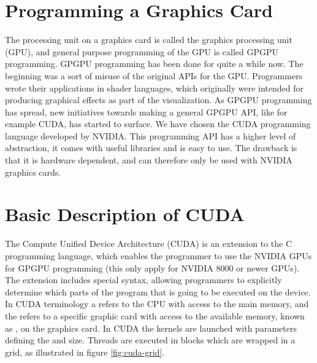 \section{Programming a Graphics Card}
The processing unit on a graphics card is called the graphics
processing unit (GPU), and general purpose programming of the GPU is
called GPGPU programming.
%
GPGPU programming has been done for quite a while now. The beginning was
a sort of misuse of the original APIs for the GPU. Programmers wrote
their applications in shader languages, which originally were intended
for producing graphical effects as part of the visualization.
%
As GPGPU programming has spread, new initiatives towards making a
general GPGPU API, like for example CUDA, has started to surface.
%
%
%
We have chosen the CUDA programming language
developed by NVIDIA. This programming API has a higher level of
abstraction, it comes with useful libraries and is easy to use. The
drawback is that it is hardware dependent, and can therefore only be
used with NVIDIA graphics cards.

\layoutnewpage

\section{Basic Description of CUDA}
The Compute Unified Device Architecture (CUDA) is an
extension to the C programming language, which enables the programmer
to use the NVIDIA GPUs for GPGPU programming (this only apply for
NVIDIA 8000 or newer GPUs).
%
The extension includes special syntax, allowing programmers to
explicitly determine which parts of the program that is going to be
executed on the device. 
%
In CUDA terminology a  refers to the CPU with access to the main
memory, and the  refers to a specific graphic card with access
to the available memory, known as , on the graphics card.
%
%
In CUDA the kernels are launched with parameters defining the
 and  size. Threads are executed in
blocks which are wrapped in a grid,
as illustrated in figure \vref{fig:cuda-grid}.

